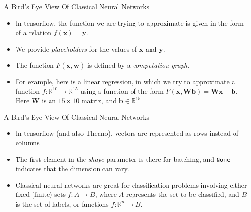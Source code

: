 \documentclass[10pt]{beamer}
\newcommand{\R}{\mathbb{R}}
\newcommand{\w}{\mathbf{w}}
\newcommand{\x}{\mathbf{x}}
\newcommand{\y}{\mathbf{y}}
\renewcommand{\b}{\mathbf{b}}
\newcommand{\W}{\mathbf{W}}
\begin{document}
\begin{frame}{A Bird's Eye View Of Classical Neural Networks}
  \begin{itemize}
    \item In tensorflow, the function we are trying to approximate is given in the form of a relation $f(\x)=\y$.
    \item We provide {\em placeholders} for the values of $\x$ and $\y$.
    \item The function $F(\x, \w)$ is defined by a {\em computation graph}.
    \item For example, here is a linear regression, in which we try to approximate a function $f:\R^{10}\to\R^{15}$ using a function of the form $F(\x, \W\b)=\W\x+\b$. Here $\W$ is an $15\times 10$ matrix, and $\b\in\R^{15}$
  \end{itemize}
\end{frame}

\begin{frame}{A Bird's Eye View Of Classical Neural Networks}
\lstI
\begin{itemize}
  \item In tensorflow (and also Theano), vectors are represented as rows instead of columns
  \item The first element in the {\em shape} parameter is there for batching, and {\tt None} indicates that the dimension can vary.
  \item Classical neural networks are great for classification problems involving either fixed (finite) sets $f:A\to B$, where $A$ represents the set to be classified, and $B$ is the set of labels, or functions $f:\R^n\to B$.

\end{itemize}
\end{frame}
\end{document}
